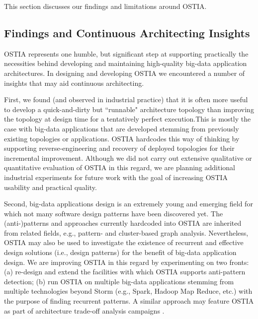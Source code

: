 This section discusses our findings and limitations around OSTIA.

\subsection{Findings and Continuous Architecting Insights}
OSTIA represents one humble, but significant step at supporting practically the necessities behind developing and maintaining high-quality big-data application architectures. In designing and developing OSTIA we encountered a number of insights that may aid continuous architecting.

First, we found (and observed in industrial practice) that it is often more useful to develop a quick-and-dirty but ``runnable" architecture topology than improving the topology at design time for a tentatively perfect execution.This is mostly the case with big-data applications that are developed stemming from previously existing topologies or applications. OSTIA hardcodes this way of thinking by supporting reverse-engineering and recovery of deployed topologies for their incremental improvement. Although we did not carry out extensive qualitative or quantitative evaluation of OSTIA in this regard, we are planning additional industrial experiments for future work with the goal of increasing OSTIA usability and practical quality.

Second, big-data applications design is an extremely young and emerging field for which not many software design patterns have been discovered yet. The (anti-)patterns and approaches currently hardcoded into OSTIA are inherited from related fields, e.g., pattern- and cluster-based graph analysis. Nevertheless, OSTIA may also be used to investigate the existence of recurrent and effective design solutions (i.e., design patterns) for the benefit of big-data application design. We are improving OSTIA in this regard by experimenting on two fronts: (a) re-design and extend the facilities with which OSTIA supports anti-pattern detection; (b) run OSTIA on multiple big-data applications stemming from multiple technologies beyond Storm (e.g., Spark, Hadoop Map Reduce, etc.) with the purpose of finding recurrent patterns. A similar approach may feature OSTIA as part of architecture trade-off analysis campaigns \cite{atam}.

